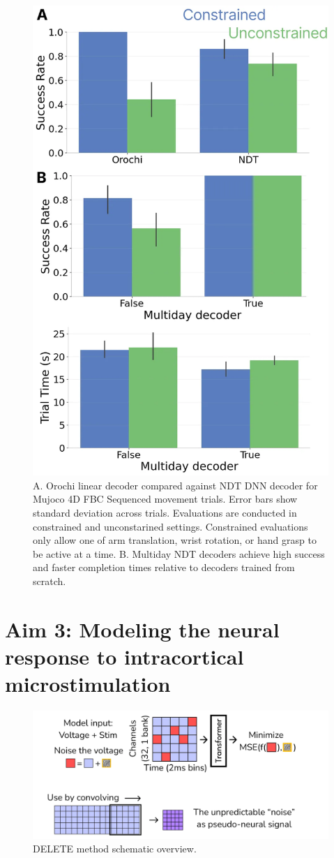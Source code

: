 \documentclass[12pt,oneside]{report}
\begin{document}
\begin{figure}[h]
  \centering
  \includegraphics[width=0.5\linewidth]{ch3_mujoco_results.png}
  \caption{A. Orochi linear decoder compared against NDT DNN decoder for Mujoco 4D FBC Sequenced movement trials. Error bars show standard deviation across trials. Evaluations are conducted in constrained and unconstarined settings. Constrained evaluations only allow one of arm translation, wrist rotation, or hand grasp to be active at a time. B. Multiday NDT decoders achieve high success and faster completion times relative to decoders trained from scratch.}
  \label{fig:mujoco}
\end{figure}

\chapter{Aim 3: Modeling the neural response to intracortical microstimulation}

\begin{figure}[h]
  \centering
  \includegraphics[width=0.5\linewidth]{ch4_delete_schema.png}
  \caption{DELETE method schematic overview.}
  \label{fig:delete_schema}
\end{figure}
\end{document}
